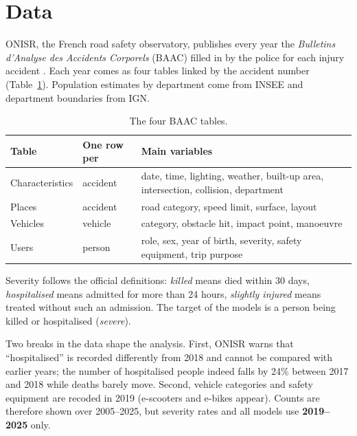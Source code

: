 \documentclass[11pt,a4paper]{article}
\begin{document}
\section{Data}

ONISR, the French road safety observatory, publishes every year the \emph{Bulletins d'Analyse des
Accidents Corporels} (BAAC) filled in by the police for each injury accident \cite{onisr}. Each year
comes as four tables linked by the accident number (Table~\ref{tab:tables}). Population estimates by
department come from INSEE and department boundaries from IGN.

\begin{table}[H]
\centering\footnotesize
\caption{The four BAAC tables.}
\label{tab:tables}
\begin{tabular}{@{}lll@{}}
\toprule
Table & One row per & Main variables \\
\midrule
Characteristics & accident & date, time, lighting, weather, built-up area, intersection, collision, department \\
Places & accident & road category, speed limit, surface, layout \\
Vehicles & vehicle & category, obstacle hit, impact point, manoeuvre \\
Users & person & role, sex, year of birth, severity, safety equipment, trip purpose \\
\bottomrule
\end{tabular}
\end{table}

Severity follows the official definitions: \emph{killed} means died within 30 days,
\emph{hospitalised} means admitted for more than 24 hours, \emph{slightly injured} means treated without
such an admission. The target of the models is a person being killed or hospitalised (\emph{severe}).

Two breaks in the data shape the analysis. First, ONISR warns that ``hospitalised'' is recorded
differently from 2018 and cannot be compared with earlier years; the number of hospitalised people
indeed falls by 24\% between 2017 and 2018 while deaths barely move. Second, vehicle categories and
safety equipment are recoded in 2019 (e-scooters and e-bikes appear). Counts are therefore shown over
2005--2025, but severity rates and all models use \textbf{2019--2025} only.

\end{document}
